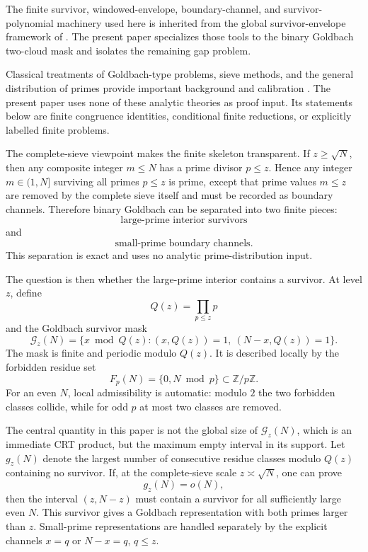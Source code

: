 \documentclass[11pt]{article}
\theoremstyle{plain}
\theoremstyle{definition}
\theoremstyle{remark}
\newcommand{\Z}{\mathbb Z}
\newcommand{\G}{\mathcal G}
\begin{document}
The finite survivor, windowed-envelope, boundary-channel, and survivor-polynomial
machinery used here is inherited from the global survivor-envelope framework
of \cite{Dura2026SurvivorEnvelopes}.  The present paper specializes those tools
to the binary Goldbach two-cloud mask and isolates the remaining gap problem.

Classical treatments of Goldbach-type problems, sieve methods, and the general
distribution of primes provide important background and calibration
\cite{HardyLittlewood1923,HalberstamRichert1974,IwaniecKowalski2004,Koukoulopoulos2019}.
The present paper uses none of these analytic theories as proof input.  Its
statements below are finite congruence identities, conditional finite
reductions, or explicitly labelled finite problems.

The complete-sieve viewpoint makes the finite skeleton transparent.  If
\(z\ge\sqrt N\), then any composite integer \(m\le N\) has a prime divisor
\(p\le z\).  Hence any integer \(m\in(1,N]\) surviving all primes \(p\le z\) is
prime, except that prime values \(m\le z\) are removed by the complete sieve
itself and must be recorded as boundary channels.  Therefore binary Goldbach can
be separated into two finite pieces:
\[
\text{large-prime interior survivors}
\]
and
\[
\text{small-prime boundary channels.}
\]
This separation is exact and uses no analytic prime-distribution input.

The question is then whether the large-prime interior contains a survivor.  At
level \(z\), define
\[
Q(z)=\prod_{p\le z}p
\]
and the Goldbach survivor mask
\[
\G_z(N)=\{x\bmod Q(z):(x,Q(z))=1,\ (N-x,Q(z))=1\}.
\]
The mask is finite and periodic modulo \(Q(z)\).  It is described locally by the
forbidden residue set
\[
F_p(N)=\{0,N\bmod p\}\subset\Z/p\Z.
\]
For an even \(N\), local admissibility is automatic: modulo \(2\) the two
forbidden classes collide, while for odd \(p\) at most two classes are removed.

The central quantity in this paper is not the global size of \(\G_z(N)\), which
is an immediate CRT product, but the maximum empty interval in its support.  Let
\(g_z(N)\) denote the largest number of consecutive residue classes modulo
\(Q(z)\) containing no survivor.  If, at the complete-sieve scale \(z\asymp
\sqrt N\), one can prove
\[
g_z(N)=o(N),
\]
then the interval \((z,N-z)\) must contain a survivor for all sufficiently large
even \(N\).  This survivor gives a Goldbach representation with both primes
larger than \(z\).  Small-prime representations are handled separately by the
explicit channels \(x=q\) or \(N-x=q\), \(q\le z\).
\end{document}
